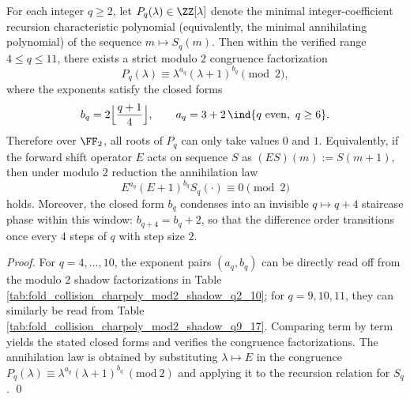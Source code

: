 \begin{proposition}\label{prop:pom-charpoly-mod2-closed-exponent-law-q4-11}
For each integer \(q\ge 2\), let \(P_q(\lambda)\in\ZZ[\lambda]\) denote the minimal integer-coefficient recursion characteristic polynomial (equivalently, the minimal annihilating polynomial) of the sequence \(m\mapsto S_q(m)\).
Then within the verified range \(4\le q\le 11\), there exists a strict modulo \(2\) congruence factorization
\[
P_q(\lambda)\equiv \lambda^{a_q}(\lambda+1)^{b_q}\pmod 2,
\]
where the exponents satisfy the closed forms
\[
b_q=2\Bigl\lfloor\frac{q+1}{4}\Bigr\rfloor,\qquad
a_q=3+2\,\ind\{q\ \mathrm{even},\ q\ge 6\}.
\]
Therefore over \(\FF_2\), all roots of \(P_q\) can only take values \(0\) and \(1\).
Equivalently, if the forward shift operator \(E\) acts on sequence \(S\) as \((ES)(m):=S(m+1)\), then under modulo \(2\) reduction the annihilation law
\[
E^{a_q}(E+1)^{b_q}S_q(\cdot)\equiv 0\pmod 2
\]
holds.
Moreover, the closed form \(b_q\) condenses into an invisible \(q\mapsto q+4\) staircase phase within this window: \(b_{q+4}=b_q+2\), so that the difference order transitions once every \(4\) steps of \(q\) with step size \(2\).
\end{proposition}
\begin{proof}
For \(q=4,\dots,10\), the exponent pairs \((a_q,b_q)\) can be directly read off from the modulo \(2\) shadow factorizations in Table \ref{tab:fold_collision_charpoly_mod2_shadow_q2_10}; for \(q=9,10,11\), they can similarly be read from Table \ref{tab:fold_collision_charpoly_mod2_shadow_q9_17}.
Comparing term by term yields the stated closed forms and verifies the congruence factorizations.
The annihilation law is obtained by substituting \(\lambda\mapsto E\) in the congruence \(P_q(\lambda)\equiv \lambda^{a_q}(\lambda+1)^{b_q}\ (\mathrm{mod}\ 2)\) and applying it to the recursion relation for \(S_q\). \qed
\end{proof}

